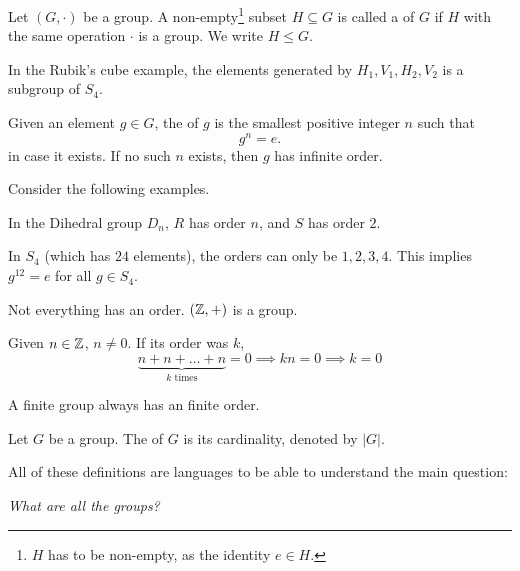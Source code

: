 \begin{definition}[Subgroup]\label{def:subgroup}
    Let $(G, \cdot)$ be a group. A non-empty\footnote{$H$ has to be non-empty, as the identity $e \in H$.} subset $H \subseteq G$ is called a  of $G$ if $H$ with the same operation $\cdot$ is a group. We write $H \leq G$. 
\end{definition}

\begin{example}
    In the Rubik's cube example, the elements generated by $H_1, V_1, H_2, V_2$ is a subgroup of $S_4$.
\end{example}

\begin{definition}\label{def:order_element}
    Given an element $g \in G$, the  of $g$ is the smallest positive integer $n$ such that \[ g^n = e. \] in case it exists. If no such $n$ exists, then $g$ has infinite order.
\end{definition}

\begin{example}
    Consider the following examples. 

    \begin{listu}
        \item In the Dihedral group $D_n$, $R$ has order $n$, and $S$ has order $2$.
        \item In $S_4$ (which has $24$ elements), the orders can only be $1, 2, 3, 4$. This implies $g^{12} = e$ for all $g \in S_4$.
        \item Not everything has an order. $(\mathbb{Z}, +)$ is a group. 
        
        Given $n \in \mathbb{Z}$, $n \neq 0$. If its order was $k$, \[
            \underbrace{n + n + \dots + n}_{k \text{ times}} = 0 \implies kn = 0 \implies k = 0
        \]
    \end{listu}
\end{example}

\begin{claim}
    A finite group always has an finite order.
\end{claim}

\begin{definition}\label{def:order_group}
    Let $G$ be a group. The  of $G$ is its cardinality, denoted by $|G|$.
\end{definition}

All of these definitions are languages to be able to understand the main question: 
\begin{center}
    \textit{What are all the groups?}
\end{center}

